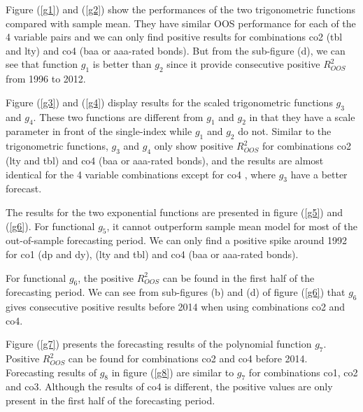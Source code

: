 \documentclass[a4paper,12pt,times,numbered,print,index]{report}
\numberwithin{equation}{section}
\begin{document}
Figure (\ref{g1}) and (\ref{g2}) show the performances of the two trigonometric functions compared with sample mean. They have similar OOS performance for each of the 4 variable pairs and we can only find positive results for combinations co2 (tbl and lty) and co4 (baa or aaa-rated bonds). But from the sub-figure (d), we can see that function $g_1$ is better than $g_2$ since it provide consecutive positive $R^2_{OOS}$ from 1996 to 2012.

Figure (\ref{g3}) and (\ref{g4}) display results for the scaled trigonometric functions $g_3$ and $g_4$. These two functions are different from $g_1$ and $g_2$ in that they have a scale parameter in front of the single-index while $g_1$ and $g_2$ do not. 
Similar to the trigonometric functions, $g_3$ and $g_4$ only show positive $R^2_{OOS}$ for combinations co2 (lty and tbl) and co4 (baa or aaa-rated bonds), and the results are almost identical for the 4 variable combinations except for co4 , where $g_3$ have a better forecast.

The results for the two exponential functions are presented in figure (\ref{g5}) and (\ref{g6}). For functional $g_5$, it cannot outperform sample mean model for most of the out-of-sample forecasting period. We can only find a positive spike around 1992 for co1 (dp and dy),  (lty and tbl) and co4 (baa or aaa-rated bonds). 

For functional $g_6$, the positive $R^2_{OOS}$ can be found in the first half of the forecasting period. We can see from sub-figures (b) and (d) of figure (\ref{g6}) that $g_6$ gives consecutive positive results before 2014 when using combinations co2 and co4. 

Figure (\ref{g7}) presents the forecasting results of the polynomial function $g_7$. Positive $R^2_{OOS}$ can be found for combinations co2 and co4 before 2014. Forecasting results of $g_8$ in figure (\ref{g8}) are similar to $g_7$ for combinations co1, co2 and co3. Although the results of co4 is different, the positive values are only present in the first half of the forecasting period. 
\end{document}
